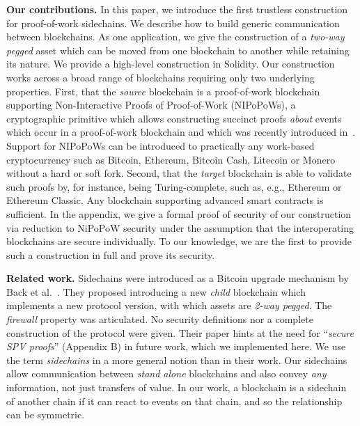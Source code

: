 \noindent\textbf{Our contributions. } In this paper, we introduce the first
trustless construction for proof-of-work sidechains. We describe how to build
generic communication between blockchains. As one application, we give the
construction of a \emph{two-way pegged} asset which can be moved from one
blockchain to another while retaining its nature. We provide a high-level
construction in Solidity. Our construction works across a broad range of
blockchains requiring only two underlying properties. First, that the
\emph{source} blockchain is a proof-of-work blockchain supporting
Non-Interactive Proofs of Proof-of-Work (NIPoPoWs), a cryptographic primitive
which allows constructing succinct proofs \emph{about} events which occur in a
proof-of-work blockchain and which was recently introduced in~\cite{nipopows}. 
Support for NIPoPoWs can be introduced to practically any
work-based cryptocurrency such as Bitcoin, Ethereum, Bitcoin Cash, Litecoin or
Monero without a hard or soft fork. Second, that the \emph{target} blockchain is
able to validate such proofs by, for instance, being Turing-complete, such as,
e.g., Ethereum or Ethereum Classic. Any blockchain supporting advanced smart
contracts is sufficient. In the appendix, we give a formal proof of security of
our construction via reduction to NiPoPoW security under the assumption that the
interoperating blockchains are secure individually. To our knowledge, we are the
first to provide such a construction in full and prove its security.

\noindent\textbf{Related work. }
Sidechains were introduced as a Bitcoin upgrade mechanism by Back et
al.~\cite{sidechains}. They proposed introducing a new \emph{child} blockchain
which implements a new protocol version, with which assets are \emph{2-way
pegged}. The \emph{firewall} property was articulated. No security definitions
nor a complete construction of the protocol were given. Their paper hints at the
need for ``\emph{secure SPV proofs}'' (Appendix B) in future work, which we
implemented here. We use the term \emph{sidechains} in a more general notion
than in their work. Our sidechains allow communication between \emph{stand
alone} blockchains and also convey \emph{any} information, not just transfers of
value. In our work, a blockchain is a sidechain of another chain if it can react
to events on that chain, and so the relationship can be symmetric.

